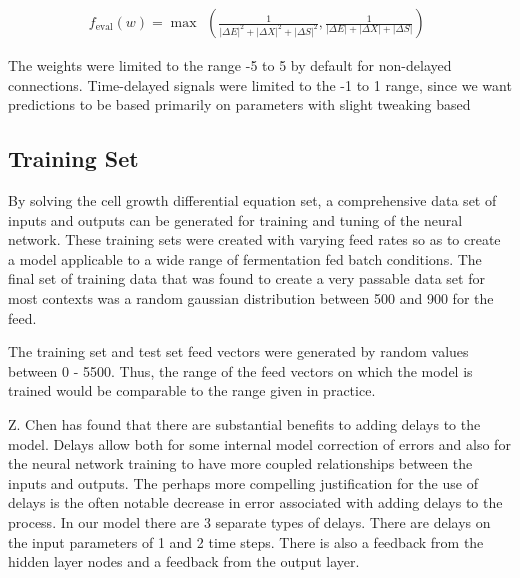\documentclass[10pt]{article}
\begin{document}
\[ f_\text{eval}(w) = \max \begin{array}{c}\left(\frac{1}{|\Delta E|^2+|\Delta X|^2+|\Delta S|^2} , \frac{1}{|\Delta E|+|\Delta X|+|\Delta S|}\right)\end{array} \]

The weights were limited to the range -5 to 5 by default for non-delayed connections. Time-delayed signals were limited to the -1 to 1 range, since we want predictions to be based primarily on parameters with slight tweaking based 

\subsection{Training Set}
By solving the cell growth differential equation set, a comprehensive data set of inputs and outputs can be generated for training and tuning of the neural network. These training sets were created with varying feed rates so as to create a model applicable to a wide range of fermentation fed batch conditions.
The final set of training data that was found to create a very passable data set for most contexts was a random gaussian distribution between 500 and 900 for the feed.

The training set and test set feed vectors were generated by random values between 0 - 5500. Thus, the range of the feed vectors on which the model is trained would be comparable to the range given in practice.


Z. Chen \cite{yeastmodel} has found that there are substantial benefits to adding delays to the model. Delays allow both for some internal model correction of errors and also for the neural network training to have more coupled relationships between the inputs and outputs. The perhaps more compelling justification for the use of delays is the often notable decrease in error associated with adding delays to the process. 
In our model there are 3 separate types of delays. There are delays on the input parameters of 1 and 2 time steps. There is also a feedback from the hidden layer nodes and a feedback from the output layer. 
\end{document}

